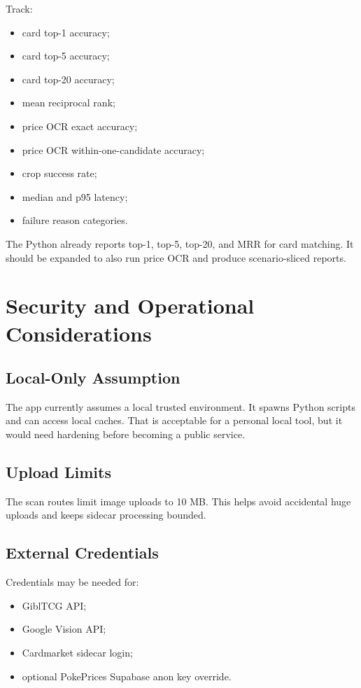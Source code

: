 \documentclass[11pt,a4paper]{article}
\begin{document}
Track:

\begin{itemize}
  \item card top-1 accuracy;
  \item card top-5 accuracy;
  \item card top-20 accuracy;
  \item mean reciprocal rank;
  \item price OCR exact accuracy;
  \item price OCR within-one-candidate accuracy;
  \item crop success rate;
  \item median and p95 latency;
  \item failure reason categories.
\end{itemize}

The Python  already reports top-1, top-5, top-20, and MRR for card matching. It should be expanded to also run price OCR and produce scenario-sliced reports.

\section{Security and Operational Considerations}

\subsection{Local-Only Assumption}

The app currently assumes a local trusted environment. It spawns Python scripts and can access local caches. That is acceptable for a personal local tool, but it would need hardening before becoming a public service.

\subsection{Upload Limits}

The scan routes limit image uploads to 10 MB. This helps avoid accidental huge uploads and keeps sidecar processing bounded.

\subsection{External Credentials}

Credentials may be needed for:

\begin{itemize}
  \item GiblTCG API;
  \item Google Vision API;
  \item Cardmarket sidecar login;
  \item optional PokePrices Supabase anon key override.
\end{itemize}
\end{document}
